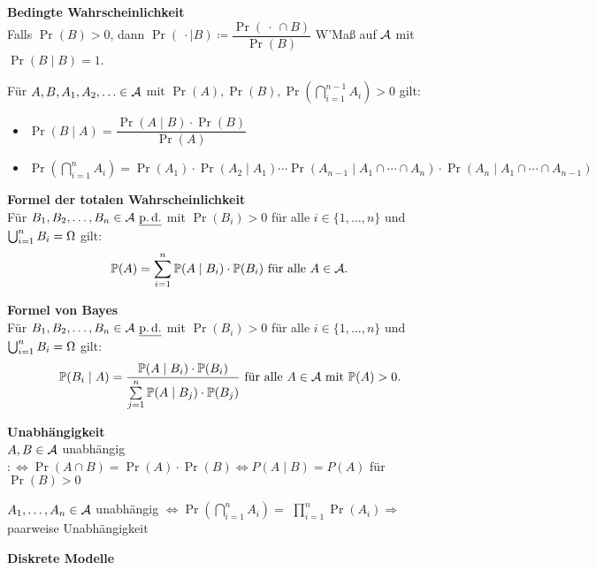 \textbf{Bedingte Wahrscheinlichkeit}\\
Falls $\Pr(B) > 0$, dann
$\Pr(\ \cdot \mid B) \coloneqq \dfrac{\Pr(\ \cdot\ \cap B)}{\Pr(B)}$
W'Maß auf $\mathcal{A}$ mit $\Pr(B \mid B) = 1$.

Für $A,B,A_1,A_2,\ldots\in\mathcal{A}$ mit
$\Pr(A),\Pr(B), \Pr(\bigcap_{i=1}^{n-1} A_i) > 0$ gilt:

\begin{itemize}
\item $\Pr(B \mid A) = \dfrac{\Pr(A \mid B) \cdot \Pr(B)}{\Pr(A)}$
\item $\Pr(\bigcap_{i=1}^{n} A_i) = \Pr(A_1) \cdot \Pr(A_2 \mid A_1) \cdots
  \Pr(A_{n-1} \mid A_1 \cap \cdots \cap A_n) \cdot \Pr(A_n \mid A_1 \cap \cdots \cap A_{n-1})$
\end{itemize}

\textbf{Formel der totalen Wahrscheinlichkeit}\\
Für $B_1,B_2,\ldots,B_n\in\mathcal{A}\ \underline{\operatorname{p.d.}}$ mit $\Pr(B_i) > 0$ für alle
$i\in\{1,\ldots,n\}$ und $\bigcup_{i=1}^{n} B_i = \Omega$ gilt:
\[
  \mathbb{P}(A) = \sum_{i=1}^{n} \mathbb{P}(A \mid B_i) \cdot \mathbb{P}(B_i) \text{ für alle } A\in\mathcal{A}.
\]

\newpage

\textbf{Formel von Bayes}\\
Für $B_1,B_2,\ldots,B_n\in\mathcal{A}\ \underline{\operatorname{p.d.}}$ mit $\Pr(B_i) > 0$ für alle
$i\in\{1,\ldots,n\}$ und $\bigcup_{i=1}^{n} B_i = \Omega$ gilt:
\[
  \mathbb{P}(B_i \mid A)=
  \frac{\mathbb{P}(A \mid B_i) \cdot \mathbb{P}(B_i)}{\sum\limits_{j=1}^{n} \mathbb{P}(A \mid B_j)
  \cdot \mathbb{P}(B_j)} \text{ für alle } A\in\mathcal{A} \text{ mit } \mathbb{P}(A) > 0.
\]

\textbf{Unabhängigkeit}\\
$A,B\in\mathcal{A}$ unabhängig $:\Leftrightarrow \Pr(A \cap B) = \Pr(A) \cdot \Pr(B)
\Leftrightarrow P(A \mid B) = P(A)$ für $\Pr(B) > 0$

$A_1,\ldots,A_n\in\mathcal{A}$ unabhängig $\Leftrightarrow \Pr(\bigcap_{i=1}^{n} A_i) = $
$\prod_{i=1}^{n} \Pr(A_i) \Rightarrow $ paarweise Unabhängigkeit

\textbf{Diskrete Modelle}\\


